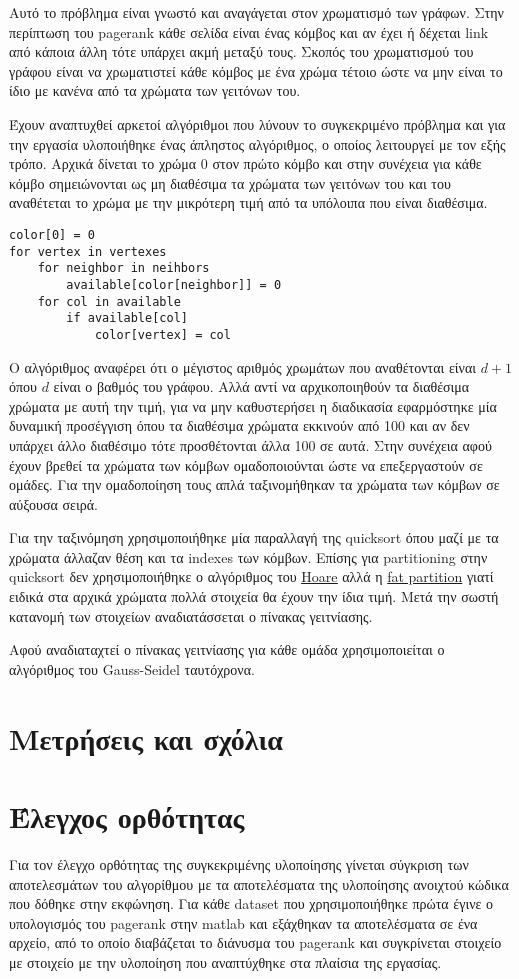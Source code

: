 \documentclass[10p]{report}
\begin{document}
Αυτό το πρόβλημα είναι γνωστό και αναγάγεται στον χρωματισμό των γράφων. Στην
περίπτωση του pagerank κάθε σελίδα είναι ένας κόμβος και αν έχει ή δέχεται link
από κάποια άλλη τότε υπάρχει ακμή μεταξύ τους. Σκοπός του χρωματισμού του γράφου
είναι να χρωματιστεί κάθε κόμβος με ένα χρώμα τέτοιο ώστε να μην είναι το ίδιο
με κανένα από τα χρώματα των γειτόνων του. 

Έχουν αναπτυχθεί αρκετοί αλγόριθμοι που λύνουν το συγκεκριμένο πρόβλημα και για
την εργασία υλοποιήθηκε ένας άπληστος αλγόριθμος, ο οποίος λειτουργεί
με τον εξής τρόπο. Αρχικά δίνεται το χρώμα 0 στον πρώτο κόμβο και στην συνέχεια
για κάθε κόμβο σημειώνονται ως μη διαθέσιμα τα χρώματα των γειτόνων του και του
αναθέτεται το χρώμα με την μικρότερη τιμή από τα υπόλοιπα που είναι διαθέσιμα. 
\newpage
\begin{lstlisting}
color[0] = 0
for vertex in vertexes
    for neighbor in neihbors
        available[color[neighbor]] = 0
    for col in available
        if available[col]
            color[vertex] = col
\end{lstlisting}

Ο αλγόριθμος αναφέρει ότι ο μέγιστος αριθμός χρωμάτων που αναθέτονται είναι
$ d + 1 $ όπου $ d $ είναι ο βαθμός του γράφου. Αλλά αντί να αρχικοποιηθούν τα διαθέσιμα
χρώματα με αυτή την τιμή, για να μην καθυστερήσει η διαδικασία εφαρμόστηκε μία
δυναμική προσέγγιση όπου τα διαθέσιμα χρώματα εκκινούν από 100 και αν δεν
υπάρχει άλλο διαθέσιμο τότε προσθέτονται άλλα 100 σε αυτά.
Στην συνέχεια αφού έχουν βρεθεί τα χρώματα των κόμβων ομαδοποιούνται ώστε να
επεξεργαστούν σε ομάδες. Για την ομαδοποίηση τους απλά ταξινομήθηκαν τα χρώματα
των κόμβων σε αύξουσα σειρά.

Για την ταξινόμηση χρησιμοποιήθηκε μία παραλλαγή της quicksort όπου μαζί με τα
χρώματα άλλαζαν θέση και τα indexes των κόμβων. Επίσης για partitioning στην
quicksort δεν χρησιμοποιήθηκε ο αλγόριθμος του 
\href{https://en.wikipedia.org/wiki/Quicksort#Hoare_partition_scheme}{\underline{Hoare}}
αλλά η \underline{fat partition}
γιατί ειδικά στα αρχικά χρώματα πολλά στοιχεία θα έχουν την ίδια τιμή. Μετά την
σωστή κατανομή των στοιχείων αναδιατάσσεται ο πίνακας γειτνίασης. 

Αφού αναδιαταχτεί ο πίνακας γειτνίασης για κάθε ομάδα χρησιμοποιείται ο
αλγόριθμος του Gauss-Seidel ταυτόχρονα. 

\section*{Μετρήσεις και σχόλια}

\section*{Έλεγχος ορθότητας}

Για τον έλεγχο ορθότητας της συγκεκριμένης υλοποίησης γίνεται σύγκριση των αποτελεσμάτων 
του αλγορίθμου με τα αποτελέσματα της υλοποίησης ανοιχτού κώδικα που δόθηκε στην εκφώνηση. Για 
κάθε dataset που χρησιμοποιήθηκε πρώτα έγινε ο υπολογισμός του pagerank στην 
matlab και εξάχθηκαν τα αποτελέσματα σε ένα αρχείο, από το οποίο διαβάζεται το 
διάνυσμα του pagerank και συγκρίνεται στοιχείο με στοιχείο με την υλοποίηση 
που αναπτύχθηκε στα πλαίσια της εργασίας. 
\end{document}
